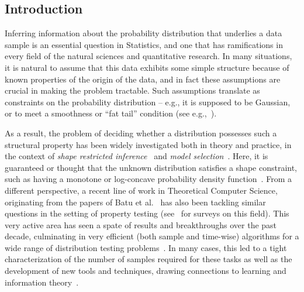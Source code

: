 \subsection{Introduction}\label{sec:introduction}
Inferring information about the probability distribution that underlies a data sample is an essential question in Statistics, and one that has ramifications in every field of the natural sciences and quantitative research. In many situations, it is natural to assume that this data exhibits some simple structure because of known properties of the origin of the data, and in fact these assumptions are crucial in making the problem tractable. Such assumptions translate as constraints on the probability distribution -- e.g., it is supposed to be Gaussian, or to meet a smoothness or ``fat tail'' condition (see e.g.,~\cite{Mandelbrot:63:FatTail,Hougaard:86:StableDistribs,PhysRevLett:95}).

As a result, the problem of deciding whether a distribution possesses such a structural property has been widely investigated both in theory and practice, in the context of \emph{shape restricted inference}~\cite{BBBB:72,SS:01} and \emph{model selection}~\cite{MP:03}. Here, it is guaranteed or thought that the unknown distribution satisfies a shape constraint, such as having a monotone or log-concave probability density function~\cite{SN:99,BB:05,Wal:09,Diakonikolas:CRC}.
From a different perspective, a recent line of work in Theoretical Computer Science, originating from the papers of Batu et al.~\cite{BFRSW:00,BFFKRW:01,GRexp:00} has also been tackling similar questions in the setting of property testing (see~\cite{Ron:08,Ron:10,Rubinfeld:12:Taming,Canonne:15:BlueData} for surveys on this field). This very active area has seen a spate of results and breakthroughs over the past decade, culminating in very efficient (both sample and time-wise) algorithms for a wide range of distribution testing problems~\cite{BDKR:05,GMV:06,Alon:2007,DDSVV:13,CDVV:14,AD:15,DKN:15}. In many cases, this led to a tight characterization of the number of samples required for these tasks as well as the development of new tools and techniques, drawing connections to learning and information theory~\cite{ValiantValiant:10lb,VV:11:stoc,VV:14,DK:16}.


